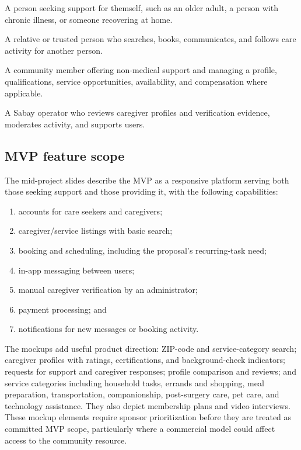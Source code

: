 \documentclass[11pt]{article}
\begin{document}
\begin{description}[style=nextline]
  \item[Care seeker] A person seeking support for themself, such as an older adult, a person with chronic illness, or someone recovering at home.
  \item[Family coordinator] A relative or trusted person who searches, books, communicates, and follows care activity for another person.
  \item[Caregiver/helper] A community member offering non-medical support and managing a profile, qualifications, service opportunities, availability, and compensation where applicable.
  \item[Platform administrator] A Sabay operator who reviews caregiver profiles and verification evidence, moderates activity, and supports users.
\end{description}

\subsection{MVP feature scope}

The mid-project slides describe the MVP as a responsive platform serving both those seeking support and those providing it, with the following capabilities:

\begin{enumerate}
  \item accounts for care seekers and caregivers;
  \item caregiver/service listings with basic search;
  \item booking and scheduling, including the proposal's recurring-task need;
  \item in-app messaging between users;
  \item manual caregiver verification by an administrator;
  \item payment processing; and
  \item notifications for new messages or booking activity.
\end{enumerate}

The mockups add useful product direction: ZIP-code and service-category search; caregiver profiles with ratings, certifications, and background-check indicators; requests for support and caregiver responses; profile comparison and reviews; and service categories including household tasks, errands and shopping, meal preparation, transportation, companionship, post-surgery care, pet care, and technology assistance. They also depict membership plans and video interviews. These mockup elements require sponsor prioritization before they are treated as committed MVP scope, particularly where a commercial model could affect access to the community resource.
\end{document}
